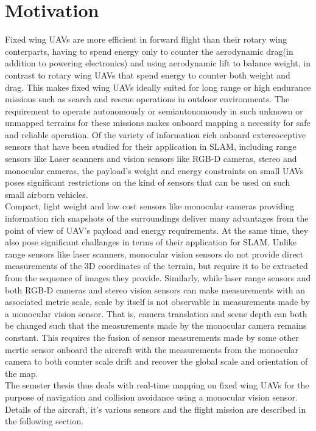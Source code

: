 \section{Motivation}
\label{sec:intro_motivation}
Fixed wing UAVs are more efficient in forward flight than their rotary wing conterparts, having to spend energy only to counter the aerodynamic drag(in addition to powering electronics) and using aerodynamic lift to balance weight, in contrast to rotary wing UAVs that spend energy to counter both weight and drag. This makes fixed wing UAVs ideally suited for long range or high endurance missions such as search and rescue operations in outdoor environments. The requirement to operate autonomously or semiautonomously in such unknown or unmapped terrains for these missions makes onboard mapping a necessity for safe and reliable operation. Of the variety of information rich onboard extereoceptive sensors that have been studied for their application in SLAM, including range sensors like Laser scanners and vision sensors like RGB-D cameras, stereo and monocular cameras, the payload's weight and energy constraints on small UAVs poses significant restrictions on the kind of sensors that can be used on such small airborn vehicles.\\ 
Compact, light weight and low cost sensors like monocular cameras providing information rich snapshots of the surroundings deliver many advantages from the point of view of UAV's payload and energy requirements. At the same time, they also pose significant challanges in terms of their application for SLAM. Unlike range sensors like laser scanners, monocular vision sensors do not provide direct measurements of the 3D coordinates of the terrain, but require it to be extracted from the sequence of images they provide. Similarly, while laser range sensors and both RGB-D cameras and stereo vision sensors can make measurements with an associated metric scale, scale by itself is not observable in measurements made by a monocular vision sensor. That is, camera translation and scene depth can both be changed such that the measurements made by the monocular camera remains constant. This requires the fusion of sensor measurements made by some other mertic sensor onboard the aircraft with the measurements from the monocular camera to both counter scale drift and recover the global scale and orientation of the map.\\
The semster thesis thus deals with real-time mapping on fixed wing UAVs for the purpose of navigation and collision avoidance using a monocular vision sensor. Details of the aircraft, it's various sensors and the flight mission are described in the following section.

